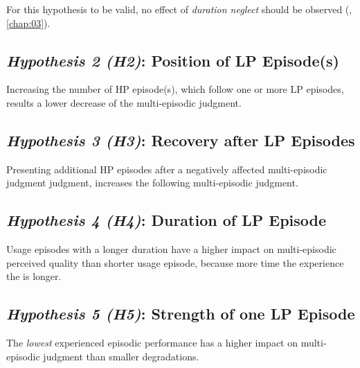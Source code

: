 For this hypothesis to be valid, no effect of \emph{duration neglect} should be observed (\cf, \autoref{chap:03}).


\subsection*{\emph{Hypothesis 2 (H2)}: Position of \ac{LP} Episode(s)}
\begin{hypothesis}[H2]
Increasing the number of \ac{HP} episode(s), which follow one or more \ac{LP} episodes, results a lower decrease of the multi-episodic judgment.
\end{hypothesis}


\subsection*{\emph{Hypothesis 3 (H3)}: Recovery after \ac{LP} Episodes}
\begin{hypothesis}[H3]
Presenting additional \ac{HP} episodes after a negatively affected multi-episodic judgment judgment, increases the following multi-episodic judgment.
\end{hypothesis}


\subsection*{\emph{Hypothesis 4 (H4)}: Duration of \ac{LP} Episode}
\begin{hypothesis}[H5]
Usage episodes with a longer duration have a higher impact on multi-episodic perceived quality than shorter usage episode, because more time the experience the is longer.
\end{hypothesis}

\subsection*{\emph{Hypothesis 5 (H5)}: Strength of one \ac{LP} Episode}
\begin{hypothesis}[H5]
The \emph{lowest} experienced episodic performance has a higher impact on multi-episodic judgment than smaller degradations.
\end{hypothesis}

